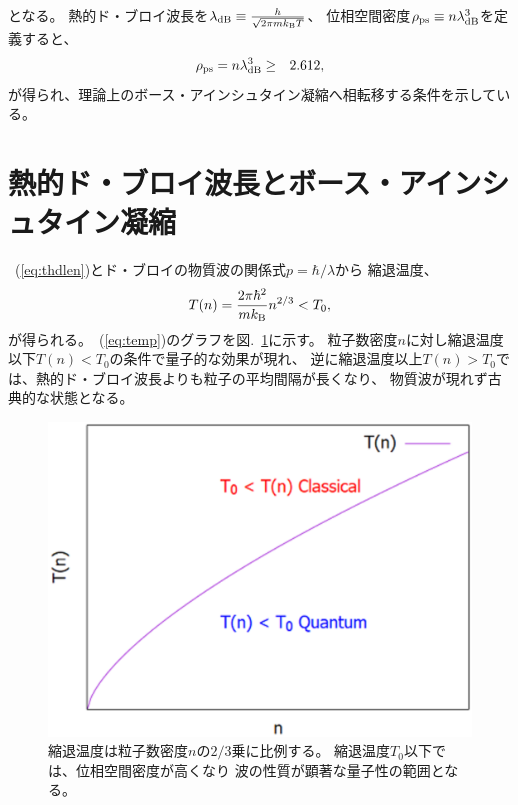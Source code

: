 \documentclass[12pt,a4paper]{jbook}
\newcommand{\kb} {k_{\rm B}}				%
\begin{document}
        となる。
        熱的ド・ブロイ波長を${\lambda_{{\rm dB}}} \equiv \frac{h}{\sqrt{2 \pi m \kb T}}$、
        位相空間密度$\rho_{{\rm ps}} \equiv n \lambda_{{\rm dB}}^3$を定義すると、
		\begin{eqnarray}
            \label{eq:thdlen}
			\rho_{{\rm ps}} = n \lambda_{{\rm dB}}^3 & \ge & 2.612,
		\end{eqnarray}
        が得られ、理論上のボース・アインシュタイン凝縮へ相転移する条件を示している。


		\section{熱的ド・ブロイ波長とボース・アインシュタイン凝縮}
		~(\ref{eq:thdlen})とド・ブロイの物質波の関係式$p=\hbar/\lambda$から
		縮退温度、
		\begin{eqnarray}
            \label{eq:temp}
			T(n) = \frac{2 \pi \hbar^2}{m k_{\rm B}}n^{2/3} < T_0,
		\end{eqnarray}
		が得られる。~(\ref{eq:temp})のグラフを図.~\ref{FIG:debroglie}に示す。
        粒子数密度$n$に対し縮退温度以下$T(n)<T_0$の条件で量子的な効果が現れ、
		逆に縮退温度以上$T(n)>T_0$では、熱的ド・ブロイ波長よりも粒子の平均間隔が長くなり、
		物質波が現れず古典的な状態となる。
		\begin{figure}[H]
			\begin{center}
				\includegraphics[width=14cm]{debroglie.eps}
				\caption{
                    縮退温度は粒子数密度$n$の$2/3$乗に比例する。
					縮退温度$T_0$以下では、位相空間密度が高くなり
                    波の性質が顕著な量子性の範囲となる。
				}
				\label{FIG:debroglie}
			\end{center}
		\end{figure}
\end{document}
